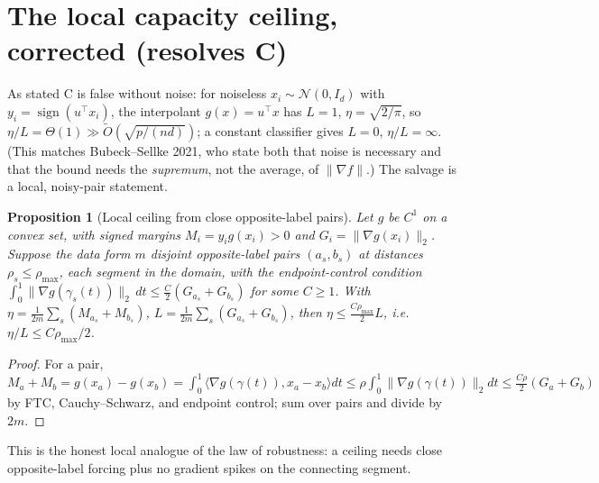 \documentclass[11pt]{article}
\newtheorem{proposition}{Proposition}
\theoremstyle{definition}
\newcommand{\grad}{\nabla}
\begin{document}
\section{The local capacity ceiling, corrected (resolves C)}\label{sec:Cprime}
As stated C is false without noise: for noiseless $x_i\sim\mathcal N(0,I_d)$ with
$y_i=\operatorname{sign}(u^\top x_i)$, the interpolant $g(x)=u^\top x$ has $L=1$,
$\eta=\sqrt{2/\pi}$, so $\eta/L=\Theta(1)\gg\tilde O(\sqrt{p/(nd)})$; a constant
classifier gives $L=0$, $\eta/L=\infty$. (This matches Bubeck--Sellke 2021, who state
both that noise is necessary and that the bound needs the \emph{supremum}, not the
average, of $\|\grad f\|$.) The salvage is a local, noisy-pair statement.
\begin{proposition}[Local ceiling from close opposite-label pairs]\label{prop:Cprime}
Let $g$ be $C^1$ on a convex set, with signed margins $M_i=y_ig(x_i)>0$ and
$G_i=\|\grad g(x_i)\|_2$. Suppose the data form $m$ disjoint opposite-label pairs
$(a_s,b_s)$ at distances $\rho_s\le\rho_{\max}$, each segment in the domain, with the
endpoint-control condition $\int_0^1\|\grad g(\gamma_s(t))\|_2\,dt\le\frac C2(G_{a_s}+G_{b_s})$
for some $C\ge1$. With $\eta=\frac1{2m}\sum_s(M_{a_s}+M_{b_s})$,
$L=\frac1{2m}\sum_s(G_{a_s}+G_{b_s})$, then $\eta\le\frac{C\rho_{\max}}{2}L$, i.e.\
$\eta/L\le C\rho_{\max}/2$.
\end{proposition}
\begin{proof}
For a pair, $M_{a}+M_{b}=g(x_a)-g(x_b)=\int_0^1\langle\grad g(\gamma(t)),x_a-x_b\rangle dt
\le\rho\int_0^1\|\grad g(\gamma(t))\|_2dt\le\frac{C\rho}{2}(G_a+G_b)$ by FTC,
Cauchy--Schwarz, and endpoint control; sum over pairs and divide by $2m$.
\end{proof}
This is the honest local analogue of the law of robustness: a ceiling needs close
opposite-label forcing plus no gradient spikes on the connecting segment.
\end{document}
